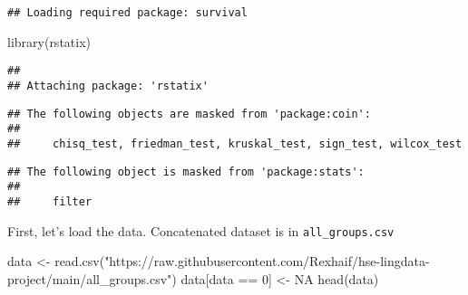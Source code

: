 \documentclass[
]{article}
\newenvironment{Shaded}{\begin{snugshade}}{\end{snugshade}}
\newcommand{\ConstantTok}[1]{\textcolor[rgb]{0.00,0.00,0.00}{#1}}
\newcommand{\DecValTok}[1]{\textcolor[rgb]{0.00,0.00,0.81}{#1}}
\newcommand{\FunctionTok}[1]{\textcolor[rgb]{0.00,0.00,0.00}{#1}}
\newcommand{\NormalTok}[1]{#1}
\newcommand{\OtherTok}[1]{\textcolor[rgb]{0.56,0.35,0.01}{#1}}
\newcommand{\SpecialCharTok}[1]{\textcolor[rgb]{0.00,0.00,0.00}{#1}}
\newcommand{\StringTok}[1]{\textcolor[rgb]{0.31,0.60,0.02}{#1}}
\begin{document}
\begin{verbatim}
## Loading required package: survival
\end{verbatim}

\begin{Shaded}
\begin{Highlighting}[]
\FunctionTok{library}\NormalTok{(rstatix)}
\end{Highlighting}
\end{Shaded}

\begin{verbatim}
## 
## Attaching package: 'rstatix'
\end{verbatim}

\begin{verbatim}
## The following objects are masked from 'package:coin':
## 
##     chisq_test, friedman_test, kruskal_test, sign_test, wilcox_test
\end{verbatim}

\begin{verbatim}
## The following object is masked from 'package:stats':
## 
##     filter
\end{verbatim}

First, let's load the data. Concatenated dataset is in
\texttt{all\_groups.csv}

\begin{Shaded}
\begin{Highlighting}[]
\NormalTok{data }\OtherTok{\textless{}{-}} \FunctionTok{read.csv}\NormalTok{(}\StringTok{"https://raw.githubusercontent.com/Rexhaif/hse{-}lingdata{-}project/main/all\_groups.csv"}\NormalTok{)}
\NormalTok{data[data }\SpecialCharTok{==} \DecValTok{0}\NormalTok{] }\OtherTok{\textless{}{-}} \ConstantTok{NA}
\FunctionTok{head}\NormalTok{(data)}
\end{Highlighting}
\end{Shaded}
\end{document}

